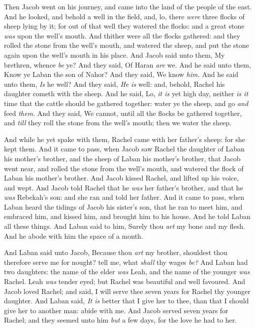 \documentclass[11pt,letterpaper,oneside]{memoir}
\begin{document}
Then Jacob went on his journey, and came into the land of the people of
the east. And he looked, and behold a well in the field, and, lo, there
\emph{were} three flocks of sheep lying by it; for out of that well they
watered the flocks: and a great stone \emph{was} upon the well's mouth.
And thither were all the flocks gathered: and they rolled the stone from
the well's mouth, and watered the sheep, and put the stone again upon
the well's mouth in his place. And Jacob said unto them, My brethren,
whence \emph{be} ye? And they said, Of Haran \emph{are} we. And he said
unto them, Know ye Laban the son of Nahor? And they said, We know
\emph{him. }And he said unto them, \emph{Is} he well? And they said,
\emph{He is} well: and, behold, Rachel his daughter cometh with the
sheep. And he said, Lo, \emph{it is} yet high day, neither \emph{is it}
time that the cattle should be gathered together: water ye the sheep,
and go \emph{and} feed \emph{them. }And they said, We cannot, until all
the flocks be gathered together, and \emph{till} they roll the stone
from the well's mouth; then we water the sheep.

And while he yet spake with them, Rachel came with her father's sheep:
for she kept them. And it came to pass, when Jacob saw Rachel the
daughter of Laban his mother's brother, and the sheep of Laban his
mother's brother, that Jacob went near, and rolled the stone from the
well's mouth, and watered the flock of Laban his mother's brother. And
Jacob kissed Rachel, and lifted up his voice, and wept. And Jacob told
Rachel that he \emph{was} her father's brother, and that he \emph{was}
Rebekah's son: and she ran and told her father. And it came to pass,
when Laban heard the tidings of Jacob his sister's son, that he ran to
meet him, and embraced him, and kissed him, and brought him to his
house. And he told Laban all these things. And Laban said to him, Surely
thou \emph{art} my bone and my flesh. And he abode with him the space of
a month.

And Laban said unto Jacob, Because thou \emph{art} my brother, shouldest
thou therefore serve me for nought? tell me, what \emph{shall} thy wages
\emph{be? }And Laban had two daughters: the name of the elder \emph{was}
Leah, and the name of the younger \emph{was} Rachel. Leah \emph{was}
tender eyed; but Rachel was beautiful and well favoured. And Jacob loved
Rachel; and said, I will serve thee seven years for Rachel thy younger
daughter. And Laban said, \emph{It is} better that I give her to thee,
than that I should give her to another man: abide with me. And Jacob
served seven years for Rachel; and they seemed unto him \emph{but} a few
days, for the love he had to her.
\end{document}
